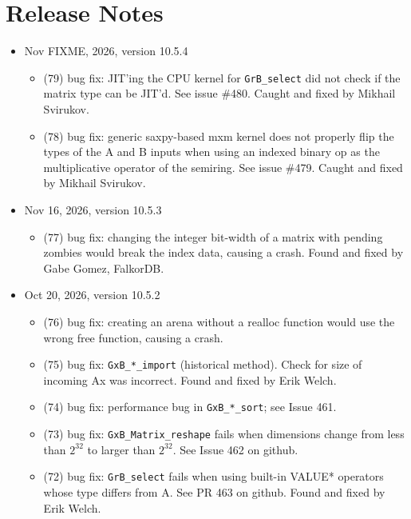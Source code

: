 
\section{Release Notes}

\begin{itemize}

\item Nov FIXME, 2026, version 10.5.4

    \begin{itemize}
    \item (79) bug fix: JIT'ing the CPU kernel for \verb'GrB_select'
        did not check if the matrix type can be JIT'd.
        See issue \#480.  Caught and fixed by Mikhail Svirukov.
    \item (78) bug fix: generic saxpy-based mxm kernel does not properly
        flip the types of the A and B inputs when using an indexed binary op as
        the multiplicative operator of the semiring.
        See issue \#479.  Caught and fixed by Mikhail Svirukov.
    \end{itemize}

\item Nov 16, 2026, version 10.5.3

    \begin{itemize}
    \item (77) bug fix: changing the integer bit-width of a matrix with pending
        zombies would break the index data, causing a crash.
        Found and fixed by Gabe Gomez, FalkorDB.
    \end{itemize}

\item Oct 20, 2026, version 10.5.2

    \begin{itemize}
    \item (76) bug fix: creating an arena without a realloc function would
        use the wrong free function, causing a crash.
    \item (75) bug fix: \verb'GxB_*_import' (historical method).  Check for
        size of incoming Ax was incorrect.  Found and fixed by Erik Welch.
    \item (74) bug fix: performance bug in \verb'GxB_*_sort'; see Issue 461.
    \item (73) bug fix: \verb'GxB_Matrix_reshape' fails when dimensions change
        from less than $2^{32}$ to larger than $2^{32}$.  See Issue 462 on
        github.
    \item (72) bug fix: \verb'GrB_select' fails when using built-in VALUE*
        operators whose type differs from A.  See PR 463 on github.
        Found and fixed by Erik Welch.
    \end{itemize}


\end{itemize}
